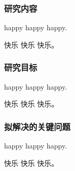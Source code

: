 
\justifying

\subsubsection{研究内容}

\indent\setlength{\parindent}{2em}%

happy happy happy.

快乐 快乐 快乐。

\subsubsection{研究目标}

\indent\setlength{\parindent}{2em}%

happy happy happy.

快乐 快乐 快乐。

\subsubsection{拟解决的关键问题}

\indent\setlength{\parindent}{2em}%

happy happy happy.

快乐 快乐 快乐。

\clearpage